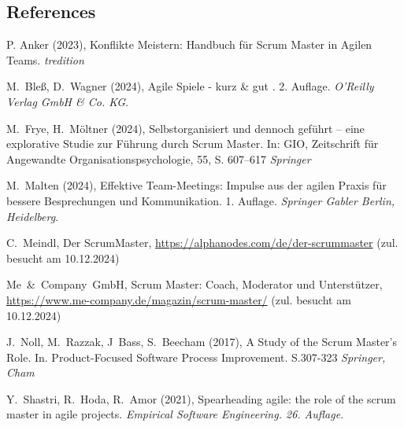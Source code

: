 \documentclass[5pt, final]{beamer}
\begin{document}
\begin{frame}[t]
\begin{multicols}{3}
			
			
			\subsection{References}
						
			\begin{thebibliography}{99}
				
%				
%				
				
				 P. Anker (2023), Konflikte Meistern: Handbuch für Scrum Master in Agilen Teams. \textit{tredition}
				
				 M.~Bleß, D.~Wagner (2024), Agile Spiele - kurz \& gut . 2. Auflage. \textit{O'Reilly Verlag GmbH \& Co. KG}.
				
				 M.~Frye, H.~Möltner (2024), Selbstorganisiert und dennoch geführt – eine explorative Studie zur Führung durch Scrum Master. In: GIO, Zeitschrift für Angewandte Organisationspsychologie, 55, S. 607–617 \textit{Springer}
				
				 M.~Malten (2024), Effektive Team-Meetings: Impulse aus der agilen Praxis für bessere Besprechungen und Kommunikation. 1. Auflage. \textit{Springer Gabler Berlin, Heidelberg}.
				
				 C.~Meindl, Der ScrumMaster, \url{https://alphanodes.com/de/der-scrummaster} (zul. besucht am 10.12.2024)
				
				 Me~\&~Company~GmbH, Scrum Master: Coach, Moderator und Unterstützer, \url{https://www.me-company.de/magazin/scrum-master/} (zul. besucht am 10.12.2024)
				
				 J.~Noll, M.~Razzak, J~Bass, S.~Beecham (2017), A Study of the Scrum Master's Role. In. Product-Focused Software Process Improvement. S.307-323 \textit{Springer, Cham}
				
				 Y.~Shastri, R.~Hoda, R.~Amor (2021), Spearheading agile: the role of the scrum master in agile projects. 
				\textit{Empirical Software Engineering. 26. Auflage.}
				

\end{thebibliography}
\end{multicols}
\end{frame}
\end{document}
